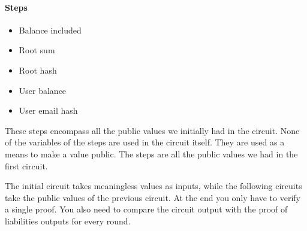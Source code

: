 \paragraph{Steps}
\begin{itemize}
   \item Balance included
   \item Root sum
   \item Root hash
   \item User balance
   \item User email hash
   \end{itemize}
These steps encompass all the public values we initially had in the circuit.
None of the variables of the steps are used in the circuit itself. They are used as a means to make a value public.
The steps are all the public values we had in the first circuit.

The initial circuit takes meaningless values as inputs, while the following circuits take the public values of the previous circuit.
At the end you only have to verify a single proof. You also need to compare the circuit output with the proof of liabilities outputs for every round.



